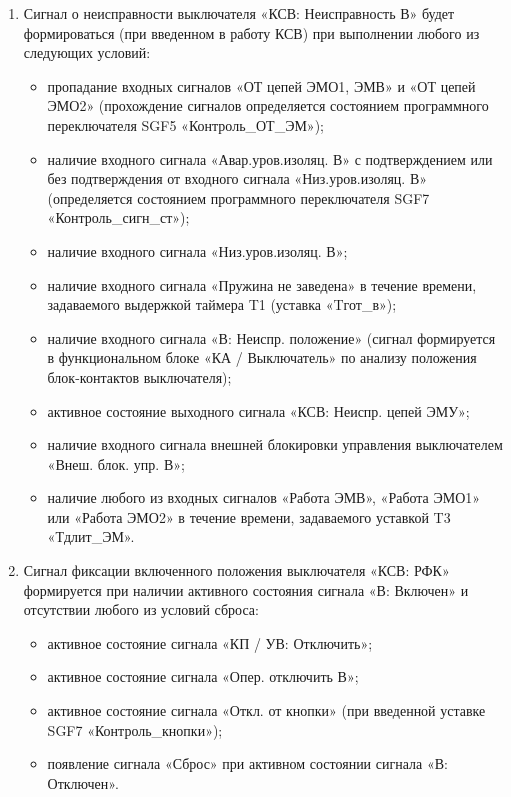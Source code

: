 \begin{enumerate}
\item
Сигнал о неисправности выключателя «КСВ: Неисправность В» будет формироваться (при введенном в работу КСВ) при выполнении любого из следующих условий:
\begin{itemize}
\sloppy
\item пропадание входных сигналов «ОТ цепей ЭМО1, ЭМВ» и «ОТ цепей ЭМО2» (прохождение сигналов определяется состоянием программного переключателя SGF5 «Контроль\_ОТ\_ЭМ»);
\item наличие входного сигнала «Авар.уров.изоляц. В» с подтверждением или без подтверждения от входного сигнала «Низ.уров.изоляц. В» (определяется состоянием программного переключателя SGF7 «Контроль\_сигн\_ст»);
\item наличие входного сигнала «Низ.уров.изоляц. В»;
\item наличие входного сигнала «Пружина не заведена» в течение времени, задаваемого выдержкой таймера T1 (уставка «Tгот\_в»);
\item наличие входного сигнала «В: Неиспр. положение» (сигнал формируется в функциональном блоке «КА / Выключатель» по анализу положения блок-контактов выключателя);
\item активное состояние выходного сигнала «КСВ: Неиспр. цепей ЭМУ»;
\item наличие входного сигнала внешней блокировки управления выключателем «Внеш. блок. упр. В»;
\item наличие любого из входных сигналов «Работа ЭМВ», «Работа ЭМО1» или «Работа ЭМО2» в течение времени, задаваемого уставкой T3 «Тдлит\_ЭМ».
\end{itemize}

\item
Сигнал фиксации включенного положения выключателя «КСВ: РФК» формируется при наличии активного состояния сигнала «В: Включен» и отсутствии любого из условий сброса:
\begin{itemize}
    \item активное состояние сигнала «КП / УВ: Отключить»;
    \item активное состояние сигнала «Опер. отключить В»;
    \item активное состояние сигнала «Откл. от кнопки» (при введенной уставке SGF7 «Контроль\_кнопки»); 
    \item появление сигнала «Сброс» при активном состоянии сигнала «В: Отключен».
\end{itemize}


\end{enumerate}
